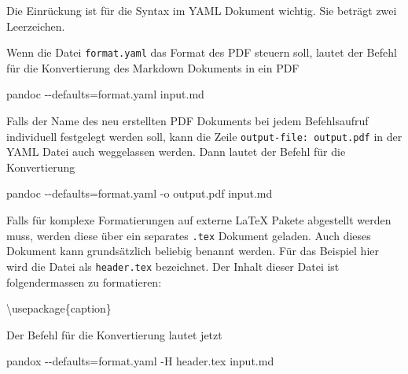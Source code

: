 \documentclass[
  nswissgerman,
  a4paper,
  DIV=11,
  numbers=noendperiod,
  ngerman]{scrreprt}
\newenvironment{Shaded}{\begin{snugshade}}{\end{snugshade}}
\newcommand{\AttributeTok}[1]{\textcolor[rgb]{0.40,0.45,0.13}{#1}}
\newcommand{\BuiltInTok}[1]{\textcolor[rgb]{0.00,0.23,0.31}{#1}}
\newcommand{\ExtensionTok}[1]{\textcolor[rgb]{0.00,0.23,0.31}{#1}}
\newcommand{\NormalTok}[1]{\textcolor[rgb]{0.00,0.23,0.31}{#1}}
\newcommand{\OperatorTok}[1]{\textcolor[rgb]{0.37,0.37,0.37}{#1}}
\begin{document}
Die Einrückung ist für die Syntax im YAML Dokument wichtig. Sie beträgt
zwei Leerzeichen.

Wenn die Datei \texttt{format.yaml} das Format des PDF steuern soll,
lautet der Befehl für die Konvertierung des Markdown Dokuments in ein
PDF

\begin{Shaded}
\begin{Highlighting}[numbers=left,,]
\ExtensionTok{pandoc} \AttributeTok{{-}{-}defaults}\OperatorTok{=}\NormalTok{format.yaml input.md}
\end{Highlighting}
\end{Shaded}

Falls der Name des neu erstellten PDF Dokuments bei jedem Befehlsaufruf
individuell festgelegt werden soll, kann die Zeile
\texttt{output-file:\ output.pdf} in der YAML Datei auch weggelassen
werden. Dann lautet der Befehl für die Konvertierung

\begin{Shaded}
\begin{Highlighting}[numbers=left,,]
\ExtensionTok{pandoc} \AttributeTok{{-}{-}defaults}\OperatorTok{=}\NormalTok{format.yaml }\AttributeTok{{-}o}\NormalTok{ output.pdf input.md}
\end{Highlighting}
\end{Shaded}

Falls für komplexe Formatierungen auf externe LaTeX Pakete abgestellt
werden muss, werden diese über ein separates \texttt{.tex} Dokument
geladen. Auch dieses Dokument kann grundsätzlich beliebig benannt
werden. Für das Beispiel hier wird die Datei als \texttt{header.tex}
bezeichnet. Der Inhalt dieser Datei ist folgendermassen zu formatieren:

\begin{Shaded}
\begin{Highlighting}[numbers=left,,]
\BuiltInTok{\textbackslash{}usepackage}\NormalTok{\{}\ExtensionTok{caption}\NormalTok{\}}
\end{Highlighting}
\end{Shaded}

Der Befehl für die Konvertierung lautet jetzt

\begin{Shaded}
\begin{Highlighting}[numbers=left,,]
\ExtensionTok{pandox} \AttributeTok{{-}{-}defaults}\OperatorTok{=}\NormalTok{format.yaml }\AttributeTok{{-}H}\NormalTok{ header.tex input.md}
\end{Highlighting}
\end{Shaded}
\end{document}
